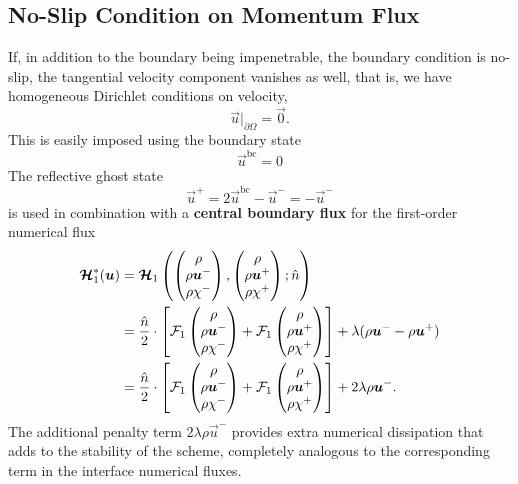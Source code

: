 \documentclass{report}
\numberwithin{equation}{section}
\begin{document}
\subsection{No-Slip Condition on Momentum Flux}

If, in addition to the boundary being impenetrable, the boundary condition is no-slip, the tangential velocity component vanishes as well, that is, we have homogeneous Dirichlet conditions on velocity,
\begin{equation}
    \vec u \bigg|_{\partial \Omega} = \vec 0.
\end{equation}
This is easily imposed using the boundary state
\begin{equation}
    \vec u^{\text{bc}} = 0
\end{equation}
The reflective ghost state
\begin{equation}
    \vec u^+ = 2 \vec u^{\text{bc}} - \vec u^- = - \vec u^-
\end{equation}
is used in combination with a \textbf{central boundary flux} for the first-order numerical flux
\begin{align}
    \boldsymbol{{\mathcal{H}}}_1^*(\boldsymbol{{u}}) & = \boldsymbol{{\mathcal{H}}}_1 \left(
        \begin{pmatrix} \rho \\ \rho \boldsymbol{{u}}^- \\ \rho \chi^- \end{pmatrix}, 
        \begin{pmatrix} \rho \\ \rho \boldsymbol{{u}}^+ \\ \rho \chi^+ \end{pmatrix}; 
    \hat n \right) \nonumber \\
    & = \frac{\hat n}{2} \cdot \left[
        \mathcal{F}_1 \begin{pmatrix} \rho \\ \rho \boldsymbol{{u}}^- \\ \rho \chi^- \end{pmatrix} 
        + \mathcal{F}_1 \begin{pmatrix} \rho \\ \rho \boldsymbol{{u}}^+ \\ \rho \chi^+ \end{pmatrix} 
    \right] + \lambda (\rho \boldsymbol{{u}}^- - \rho \boldsymbol{{u}}^+) \nonumber \\
    & = \frac{\hat n}{2} \cdot \left[
        \mathcal{F}_1 \begin{pmatrix} \rho \\ \rho \boldsymbol{{u}}^- \\ \rho \chi^- \end{pmatrix} 
        + \mathcal{F}_1 \begin{pmatrix} \rho \\ \rho \boldsymbol{{u}}^+ \\ \rho \chi^+ \end{pmatrix} 
    \right] + 2 \lambda \rho \boldsymbol{{u}}^-.
\end{align}
The additional penalty term $2 \lambda \rho \vec u^-$ provides extra numerical dissipation that adds to the stability of the scheme, completely analogous to the corresponding term in the interface numerical fluxes.
\end{document}
